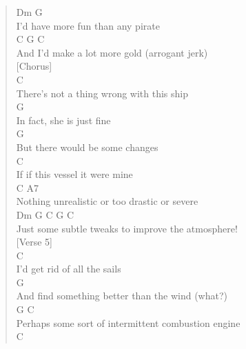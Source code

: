 \documentclass[11pt]{article}
\begin{document}
\begin{verse}
\hspace*{14em}Dm           G\\
I'd have more fun than any pirate\\
\hspace*{10em}C       G       C\\
And I'd make a lot more gold (arrogant jerk)\\
\vspace*{1em}
\vspace*{1em}
[Chorus]\\
\vspace*{1em}
\hspace*{1em}C\\
There's not a thing wrong with this ship\\
\hspace*{1em}G\\
In fact, she is just fine\\
\hspace*{1em}G\\
But there would be some changes\\
\hspace*{1em}C\\
If if this vessel it were mine\\
\hspace*{1em}C                           A7\\
Nothing unrealistic or too drastic or severe\\
\hspace*{1em}Dm                G             C         G       C\\
Just some subtle tweaks to improve the atmosphere!\\
\vspace*{1em}
\vspace*{1em}
[Verse 5]\\
\vspace*{1em}
\hspace*{1em}C\\
I'd get rid of all the sails\\
\hspace*{20em}G\\
And find something better than the wind (what?)\\
\hspace*{6em}G                              C\\
Perhaps some sort of intermittent combustion engine\\
\hspace*{10em}C\\

\end{verse}
\end{document}

